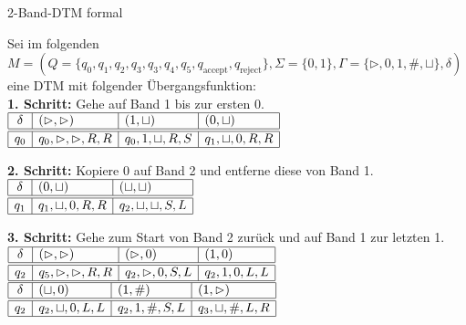 \documentclass[answers]{submit}
\begin{document}
\begin{exercise}[6]{2-Band-DTM formal}
{  Sei im folgenden $M=(Q=\{q_0,q_1,q_2,q_3,q_3,q_4,q_5,q_{\text{accept}},q_{\text{reject}}\},\Sigma=\{0,1\},\Gamma=\{\rhd,0,1,\#,\sqcup\},\delta)$
  eine DTM mit folgender Übergangsfunktion: \\

  \textbf{1. Schritt:} Gehe auf Band 1 bis zur ersten 0.\\

  $\begin{array}{|c|l|l|l|l}
      \hline
      \delta & (\rhd,\rhd)        & (1,\sqcup)       & (0,\sqcup)       \\
      \hline
      \hline
      q_0    & q_0, \rhd,\rhd,R,R & q_0,1,\sqcup,R,S & q_1,\sqcup,0,R,R
      \\
      \hline
    \end{array}$

  \vspace{1cm}
  \textbf{2. Schritt:} Kopiere 0 auf Band 2 und entferne diese von Band 1.\\

  $\begin{array}{|c|l|l|l|l}
      \hline
      \delta & (0,\sqcup)       & (\sqcup,\sqcup)       \\
      \hline
      \hline
      q_1    & q_1,\sqcup,0,R,R & q_2,\sqcup,\sqcup,S,L
      \\
      \hline
    \end{array}$

  \vspace{1cm}
  \textbf{3. Schritt:} Gehe zum Start von Band 2 zurück und auf Band 1 zur letzten 1.\\

  $\begin{array}{|c|l|l|l|l|l|l|l}
      \hline
      \delta & (\rhd,\rhd)        & (\rhd,0)       & (1,0)       \\
      \hline
      \hline
      q_2    & q_5, \rhd,\rhd,R,R & q_2,\rhd,0,S,L & q_2,1,0,L,L
      \\
      \hline
    \end{array}$ \\
  $\begin{array}{|c|l|l|l|l|l|l|l}
      \hline
      \delta & (\sqcup,0)       & (1,\#)       & (1,\rhd)          \\
      \hline
      \hline
      q_2    & q_2,\sqcup,0,L,L & q_2,1,\#,S,L & q_3,\sqcup,\#,L,R
      \\
      \hline
    \end{array}$

}
\end{exercise}
\end{document}
